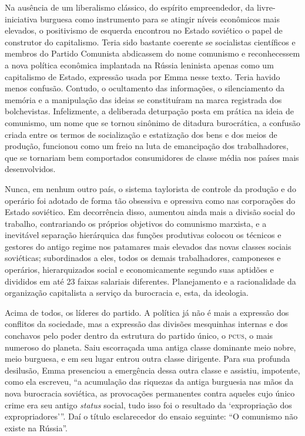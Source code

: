 Na ausência de um liberalismo clássico, do espírito empreendedor, da
livre-iniciativa burguesa como instrumento para se atingir níveis
econômicos mais elevados, o positivismo de esquerda encontrou no Estado
soviético o papel de construtor do capitalismo. Teria sido bastante
coerente se socialistas científicos e membros do Partido Comunista
abdicassem do nome comunismo e reconhecessem a nova política econômica
implantada na Rússia leninista apenas como um capitalismo de Estado,
expressão usada por Emma nesse texto. Teria havido menos confusão.
Contudo, o ocultamento das informações, o silenciamento da memória e a
manipulação das ideias se constituíram na marca registrada dos
bolchevistas. Infelizmente, a deliberada deturpação posta em prática na
ideia de comunismo, um nome que se tornou sinônimo de ditadura
burocrática, a confusão criada entre os termos de socialização e
estatização dos bens e dos meios de produção, funcionou como um freio
na luta de emancipação dos trabalhadores, que se tornariam bem
comportados consumidores de classe média nos países mais desenvolvidos.


Nunca, em nenhum outro país, o sistema taylorista de controle da 
produção e do operário foi adotado de forma tão obsessiva e opressiva
como nas corporações do Estado soviético. Em decorrência disso,
aumentou ainda mais a divisão social do trabalho, contrariando os
próprios objetivos do comunismo marxista, e a inevitável separação
hierárquica das funções produtivas colocou os técnicos e gestores do
antigo regime nos patamares mais elevados das novas classes sociais
soviéticas; subordinados a eles, todos os demais trabalhadores,
camponeses e operários, hierarquizados social e economicamente segundo
suas aptidões e divididos em até 23 faixas salariais diferentes. 
Planejamento e a racionalidade da organização capitalista a serviço da
burocracia e, esta, da ideologia.

Acima de todos, os líderes do partido. A política já não é mais a
expressão dos conflitos da sociedade, mas a expressão das divisões
mesquinhas internas e dos conchavos pelo poder dentro da estrutura do
partido único, o \textsc{pcus}, o mais numeroso do planeta. Saiu escorraçada uma
antiga classe dominante meio nobre, meio burguesa, e em seu lugar
entrou outra classe dirigente. Para sua profunda desilusão, Emma
presenciou a emergência dessa outra classe e assistiu, impotente, como
ela escreveu, “a acumulação das riquezas da antiga burguesia nas mãos
da nova burocracia soviética, as provocações permanentes contra aqueles
cujo único crime era seu antigo \textit{status} social, tudo isso foi o
resultado da ‘expropriação dos expropriadores’”. Daí o título
esclarecedor do ensaio seguinte: ``O comunismo não existe na Rússia''.

